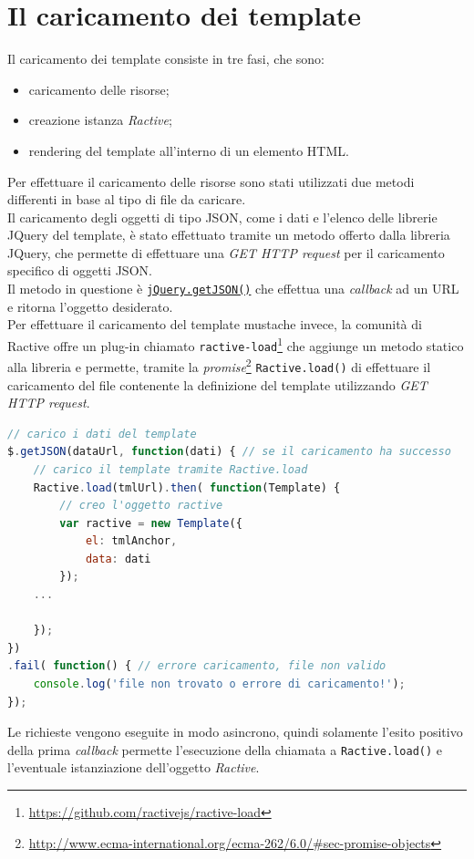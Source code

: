 \section{Il caricamento dei template}
Il caricamento dei template consiste in tre fasi, che sono:
\begin{itemize}
	\item caricamento delle risorse;
	\item creazione istanza \textit{Ractive};
	\item rendering del template all'interno di un elemento HTML.
\end{itemize}
Per effettuare il caricamento delle risorse sono stati utilizzati due metodi differenti in base al tipo di file da caricare.\\
Il caricamento degli oggetti di tipo JSON, come i dati e l'elenco delle librerie JQuery del template, è stato effettuato tramite un metodo offerto dalla libreria JQuery, che permette di effettuare una \textit{GET HTTP request} per il caricamento specifico di oggetti JSON.\\
Il metodo in questione è \href{http://api.jquery.com/jquery.getjson/}{\texttt{jQuery.getJSON()}} che effettua una \textit{callback} ad un URL e ritorna l'oggetto desiderato.\\
Per effettuare il caricamento del template mustache invece, la comunità di Ractive offre un plug-in chiamato \texttt{ractive-load}\footnote{\url{https://github.com/ractivejs/ractive-load}} che aggiunge un metodo statico alla libreria e permette, tramite la  \textit{promise}\footnote{\url{http://www.ecma-international.org/ecma-262/6.0/\#sec-promise-objects}} \texttt{Ractive.load()} di effettuare il caricamento del file contenente la definizione del template utilizzando \textit{GET HTTP request}.
\newpage
\begin{lstlisting}[language=JavaScript, caption=Chiamate \textit{GET HTTP} per il caricamento delle risorse.]
// carico i dati del template
$.getJSON(dataUrl, function(dati) { // se il caricamento ha successo
	// carico il template tramite Ractive.load
	Ractive.load(tmlUrl).then( function(Template) {
		// creo l'oggetto ractive
		var ractive = new Template({
			el: tmlAnchor,
			data: dati
		});
	...

	});
})
.fail( function() { // errore caricamento, file non valido
	console.log('file non trovato o errore di caricamento!');
});
\end{lstlisting}
Le richieste vengono eseguite in modo asincrono, quindi solamente l'esito positivo della prima \textit{callback} permette l'esecuzione della chiamata a \texttt{Ractive.load()} e l'eventuale istanziazione dell'oggetto \textit{Ractive}.\\
